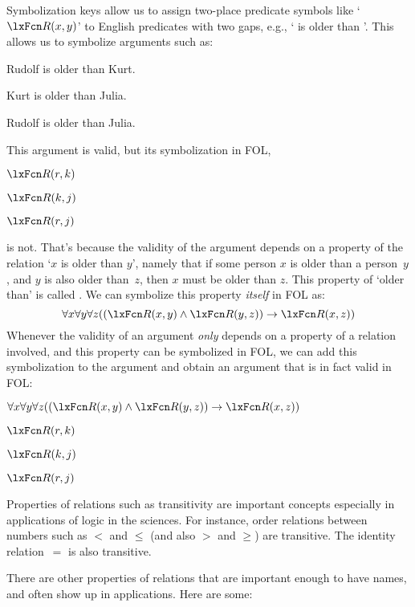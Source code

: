Symbolization keys allow us to assign two-place predicate symbols like
`$\atom{R}{x,y}$' to English predicates with two gaps, e.g., `
is older than '. This allows us to symbolize arguments such as:
\begin{earg}
	\item Rudolf is older than Kurt.
	\item Kurt is older than Julia.
	\item[\texttherefore] Rudolf is older than Julia.
\end{earg}
This argument is valid, but its symbolization in FOL,
\begin{earg}
	\item $\atom{R}{r,k}$
	\item $\atom{R}{k,j}$
	\item[\texttherefore] $\atom{R}{r,j}$
\end{earg}
is not. That's because the validity of the argument depends on a
property of the relation `$x$ is older than $y$', namely that if some
person $x$ is older than a person~$y$, and $y$ is also older than~$z$,
then $x$ must be older than $z$. This property of `older than' is
called . We can symbolize this property
\emph{itself} in FOL as:
\[
	\forall x\forall y\forall z((\atom{R}{x,y} \eand \atom{R}{y,z}) \eif
	\atom{R}{x,z})
\]
Whenever the validity of an argument \emph{only} depends on a property
of a relation involved, and this property can be symbolized in FOL, we
can add this symbolization to the argument and obtain an argument that
is in fact valid in FOL:
\begin{earg}
	\item $\forall x\forall y\forall z((\atom{R}{x,y} \eand \atom{R}{y,z}) \eif
	\atom{R}{x,z})$
	\item $\atom{R}{r,k}$
	\item $\atom{R}{k,j}$
	\item[\texttherefore] $\atom{R}{r,j}$
\end{earg}

Properties of relations such as transitivity are important concepts
especially in applications of logic in the sciences. For instance,
order relations between numbers such as $<$ and $\le$ (and also $>$
and $\ge$) are transitive. The identity relation~$=$ is also
transitive.

There are other properties of relations that are important enough to
have names, and often show up in applications. Here are some:

